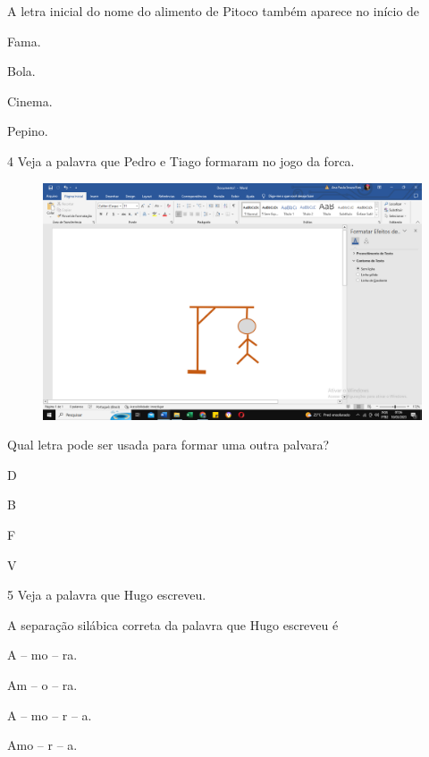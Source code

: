 
A letra inicial do nome do alimento de Pitoco também aparece no início de

\begin{escolha}
\item Fama.

\item Bola.

\item Cinema.

\item Pepino.
\end{escolha}

\num{4} Veja a palavra que Pedro e Tiago formaram no jogo da forca.

\begin{figure}[htpb!]
\centering
\includegraphics[width=.5\textwidth]{media/image150.png}
\end{figure}

Qual letra pode ser usada para formar uma outra palvara?

\begin{escolha}
\item D

\item B

\item F

\item V
\end{escolha}

\num{5} Veja a palavra que Hugo escreveu.

A separação silábica correta da palavra que Hugo escreveu é

\begin{escolha}
\item A -- mo -- ra.

\item Am -- o -- ra.

\item A -- mo -- r -- a.

\item Amo -- r -- a.
\end{escolha}

